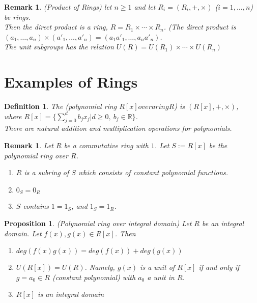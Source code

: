 \documentclass[a4paper,sfsidenotes,openany]{tufte-book}
\theoremstyle{theorem}
\newtheorem{proposition}[theorem]{Proposition}
\newtheorem{definition}[theorem]{Definition}
\newtheorem{remark}[theorem]{Remark}
\begin{document}
\begin{fullwidth}
\begin{remark}
\textit{{\color{blue} (Product of Rings)}} let $n \geq 1$ and let $R_i = (R_i, +, \times)$ ($i=1, \ldots, n$) be rings.\\
Then the direct product is a ring, $R = R_1 \times \cdots \times R_n$. (The direct product is $(a_1, \ldots, a_n) \times (a'_1, \ldots, a'_n) = (a_1 a'_1, \ldots, a_n a'_n)$.\\
The unit subgroups has the relation $U(R) = U(R_1)\times \cdots \times U(R_n)$\\
\end{remark}
\>

\section{Examples of Rings}

\begin{definition}
The \textit{{\color{blue} (polynomial ring $R[x] over a ring R$)}} is $(R[x], +, \times)$,\\
where $R[x] = \{\sum_{j=0}^{d} b_j x_j | d \geq 0, \ b_j \in \mathbb{R} \}$.\\
There are natural addition and multiplication operations for polynomials.\\
\end{definition}
\>

\begin{remark}
Let $R$ be a commutative ring with $1$. Let $S:= R[x]$ be the polynomial ring over $R$.
\begin{enumerate}[label=(\roman*),leftmargin=0pt, itemindent=4em, align=left]
\item $R$ is a subring of $S$ which consists of constant polynomial functions.
\item $0_S = 0_R$
\item $S$ contains $1=1_S$, and $1_S = 1_R$.
\end{enumerate}
\end{remark}
\>

\begin{proposition}
\textit{{\color{blue} (Polynomial ring over integral domain)}} Let $R$ be an integral domain. Let $f(x), g(x) \in R[x]$. Then
\begin{enumerate}[label=(\roman*),leftmargin=0pt, itemindent=4em, align=left]
\item $deg(f(x)g(x)) = deg(f(x))+deg(g(x))$
\item $U(R[x]) = U(R)$. Namely, $g(x)$ is a unit of $R[x]$ if and only if $g=a_0 \in R$ (constant polynomial) with $a_0$ a unit in $R$.
\item $R[x]$ is an integral domain
\end{enumerate}
\end{proposition}
\>


\end{fullwidth}
\end{document}
